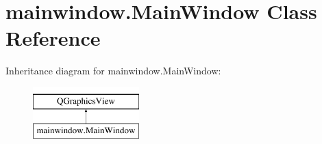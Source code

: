 \hypertarget{classmainwindow_1_1MainWindow}{}\section{mainwindow.\+Main\+Window Class Reference}
\label{classmainwindow_1_1MainWindow}
Inheritance diagram for mainwindow.\+Main\+Window\+:\begin{figure}[H]
\begin{center}
\leavevmode
\includegraphics[height=2.000000cm]{classmainwindow_1_1MainWindow}
\end{center}
\end{figure}
